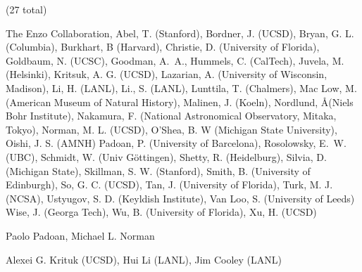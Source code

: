 \documentclass[11pt]{article}
\begin{document}
 (27 total)

\noindent The Enzo Collaboration,  
Abel, T. (Stanford),   
Bordner, J.  (UCSD),   
Bryan, G. L. (Columbia), 
Burkhart, B (Harvard),
Christie, D. (University of Florida),
Goldbaum, N. (UCSC),   
Goodman, A.~A., 
Hummels, C. (CalTech), 
Juvela, M. (Helsinki),     
Kritsuk, A. G. (UCSD),   
Lazarian, A. (University of Wisconsin, Madison),
Li, H. (LANL),
Li., S. (LANL), 
Lunttila, T. (Chalmers),
Mac Low, M. (American Museum of Natural History), 
Malinen, J. (Koeln), 
Nordlund, \AA (Niels Bohr Institute),   
Nakamura, F. (National Astronomical Observatory, Mitaka, Tokyo),
Norman, M. L. (UCSD),    
O'Shea, B. W (Michigan State University),
Oishi, J. S. (AMNH)   
Padoan, P. (University of Barcelona),   
Rosolowsky, E.~W. (UBC),   
Schmidt, W. (Univ G\"ottingen),   
Shetty, R. (Heidelburg), 
Silvia, D. (Michigan State),
Skillman, S. W. (Stanford),    
Smith, B. (University of Edinburgh),
So, G. C. (UCSD),   
Tan, J. (University of Florida),    
Turk, M. J. (NCSA), 
Ustyugov, S. D. (Keyldish Institute),
Van Loo, S. (University of Leeds)
Wise, J. (Georga Tech), 
Wu, B. (University of Florida),
Xu, H. (UCSD)


\medskip
{} Paolo Padoan, Michael L. Norman

\medskip
{} Alexei G. Krituk (UCSD), Hui
Li (LANL), Jim Cooley (LANL)
\end{document}
